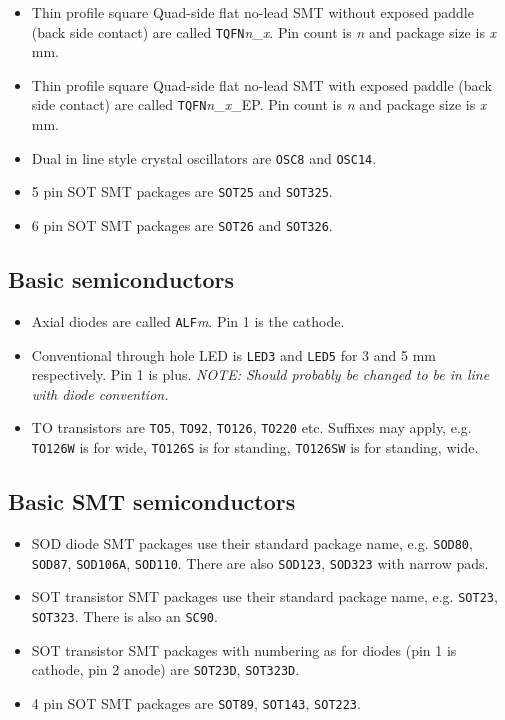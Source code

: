 \documentclass{article}
\begin{document}
\begin{itemize}
\item   Thin profile square Quad-side flat no-lead SMT without exposed
	paddle (back side contact) are called
        {\tt TQFN}{\it n}\_{\it x}.  Pin count is {\it n} and
	package size is {\it x} mm.

\item   Thin profile square Quad-side flat no-lead SMT with exposed
	paddle (back side contact) are called
        {\tt TQFN}{\it n}\_{\it x}_EP.  Pin count is {\it n} and
	package size is {\it x} mm.

\item   Dual in line style crystal oscillators are {\tt OSC8} and
	{\tt OSC14}.

\item   5 pin SOT SMT packages are {\tt SOT25} and {\tt SOT325}.

\item   6 pin SOT SMT packages are {\tt SOT26} and {\tt SOT326}.
\end{itemize}

\subsection{Basic semiconductors}
\begin{itemize}
\item   Axial diodes are called {\tt ALF}{\it m}. Pin 1 is the cathode.

\item   Conventional through hole LED is {\tt LED3} and {\tt LED5}
	for 3 and 5 mm respectively. Pin 1 is plus. 
	{\it NOTE: Should probably be changed to be in line with diode
	convention.}

\item   TO transistors are {\tt TO5}, {\tt TO92}, {\tt TO126}, 
	{\tt TO220} etc. Suffixes may apply, e.g. {\tt TO126W} is for 
	wide, {\tt TO126S} is for standing, {\tt TO126SW} is for standing,
	wide.
\end{itemize}

\subsection{Basic SMT semiconductors}
\begin{itemize}
\item   SOD diode SMT packages use their standard package name, e.g.
	{\tt SOD80}, {\tt SOD87}, {\tt SOD106A}, {\tt SOD110}. There are 
	also {\tt SOD123}, {\tt SOD323} with narrow pads.

\item   SOT transistor SMT packages use their standard package name,
	e.g. {\tt SOT23}, {\tt SOT323}. There is also an {\tt SC90}.

\item   SOT transistor SMT packages with numbering as for diodes (pin 1
	is cathode, pin 2 anode) are {\tt SOT23D}, {\tt SOT323D}.

\item   4 pin SOT SMT packages are {\tt SOT89}, {\tt SOT143}, {\tt SOT223}.
\end{itemize}
\end{document}
